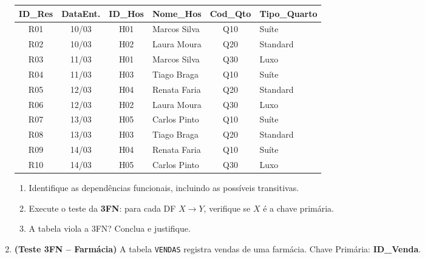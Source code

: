 \documentclass[12pt]{article}
\begin{document}
\begin{enumerate}[label=\textbf{Questão \arabic*:}, leftmargin=*]
  \vspace{0.2cm}
  \centering
  \begin{tabular}{|c|c|c|l|c|l|}
    \hline
    \textbf{ID\_Res} & \textbf{DataEnt.} & \textbf{ID\_Hos} & \textbf{Nome\_Hos} & \textbf{Cod\_Qto} & \textbf{Tipo\_Quarto} \\ \hline
    R01 & 10/03 & H01 & Marcos Silva   & Q10 & Suíte         \\ \hline
    R02 & 10/03 & H02 & Laura Moura    & Q20 & Standard      \\ \hline
    R03 & 11/03 & H01 & Marcos Silva   & Q30 & Luxo          \\ \hline
    R04 & 11/03 & H03 & Tiago Braga    & Q10 & Suíte         \\ \hline
    R05 & 12/03 & H04 & Renata Faria   & Q20 & Standard      \\ \hline
    R06 & 12/03 & H02 & Laura Moura    & Q30 & Luxo          \\ \hline
    R07 & 13/03 & H05 & Carlos Pinto   & Q10 & Suíte         \\ \hline
    R08 & 13/03 & H03 & Tiago Braga    & Q20 & Standard      \\ \hline
    R09 & 14/03 & H04 & Renata Faria   & Q10 & Suíte         \\ \hline
    R10 & 14/03 & H05 & Carlos Pinto   & Q30 & Luxo          \\ \hline
  \end{tabular}
  \flushleft
  \vspace{0.2cm}
  \begin{enumerate}[label=\alph*)]
    \item Identifique as dependências funcionais, incluindo as possíveis transitivas.
    \item Execute o teste da \textbf{3FN}: para cada DF $X \to Y$, verifique se $X$ é a chave primária.
    \item A tabela viola a 3FN? Conclua e justifique.
  \end{enumerate}

  \vspace{0.4cm}

  \item \textbf{(Teste 3FN -- Farmácia)} A tabela \texttt{VENDAS} registra vendas de uma farmácia. Chave Primária: \textbf{ID\_Venda}.


\end{enumerate}
\end{document}
